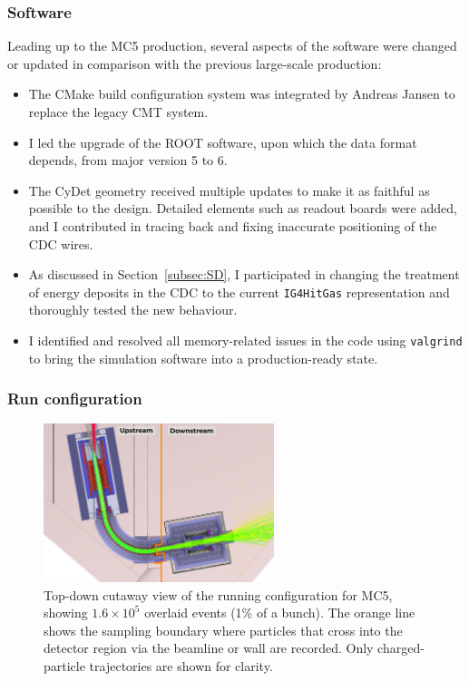 \subsubsection{Software}
Leading up to the MC5 production, several aspects of the software were changed
or updated in comparison with the previous large-scale production:
\begin{itemize}
    \item The CMake build configuration system was integrated by Andreas Jansen
    to replace the legacy CMT system. 
    \item I led the upgrade of the ROOT software, upon which the \oaEvent data format
    depends, from major version 5 to 6.
    \item The CyDet geometry received multiple updates to make it as faithful as
    possible to the design. Detailed elements such as readout boards were added,
    and I contributed in tracing back and fixing inaccurate positioning of the
    CDC wires.
    \item As discussed in Section~\ref{subsec:SD}, I participated in changing
    the treatment of energy deposits in the CDC to the current
    \texttt{IG4HitGas} representation and thoroughly tested the new behaviour.
    \item I identified and resolved all memory-related issues in the \SimG code
    using \texttt{valgrind} to bring the simulation software into a
    production-ready state.
\end{itemize}

\subsubsection{Run configuration}

\begin{figure}
    \centering
    \includegraphics[width=0.6\textwidth]{chapter3/sampling_plane_illu_ink.pdf}
    \caption{
        Top-down cutaway view of the running configuration for MC5,
        showing $1.6\times 10^5$ overlaid events (1\% of a bunch). The orange
        line shows the sampling boundary where particles that cross into the
        detector region via the beamline or wall are recorded. Only
        charged-particle trajectories are shown for clarity.
    }
    \label{fig:Phase-I Sampling World}
\end{figure}



